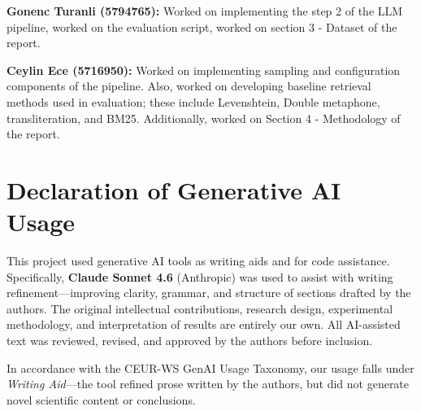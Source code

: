 \documentclass[sigconf]{acmart}
\begin{document}
\noindent\textbf{Gonenc Turanli (5794765):} Worked on implementing the step 2 of the LLM pipeline, worked on the evaluation script, worked on section 3 - Dataset of the report.

\noindent\textbf{Ceylin Ece (5716950):} Worked on implementing sampling and configuration components of the pipeline. Also, worked on developing baseline retrieval methods used in evaluation; these include Levenshtein, Double metaphone, transliteration, and BM25. Additionally, worked on Section 4 - Methodology of the report. 

\section*{Declaration of Generative AI Usage}

This project used generative AI tools as writing aids and for code assistance.
Specifically, \textbf{Claude Sonnet 4.6} (Anthropic) was used to assist with writing
refinement---improving clarity, grammar, and structure of sections drafted by the authors.
The original intellectual contributions, research design, experimental methodology,
and interpretation of results are entirely our own.
All AI-assisted text was reviewed, revised, and approved by the authors before inclusion.

In accordance with the CEUR-WS GenAI Usage Taxonomy, our usage falls under
\emph{Writing Aid}---the tool refined prose written by the authors, but did not generate
novel scientific content or conclusions.
\end{document}
